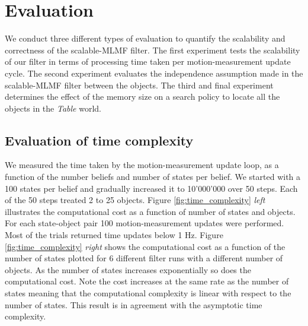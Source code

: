 


\section{Evaluation}\label{ch5:evaluation}

We conduct three different types of evaluation to quantify the scalability and correctness of the scalable-MLMF filter. The first experiment
tests the scalability of our filter in terms of processing time taken per motion-measurement update cycle. The second experiment evaluates the independence 
assumption made in the scalable-MLMF filter between the objects. The third and final experiment determines the effect of the 
memory size on a search policy to locate all the objects in the \textit{Table} world.

\subsection{Evaluation of time complexity}

We measured the time taken by the motion-measurement update loop, as a function of the number beliefs and number of states per belief. 
We started with a 100 states per belief and gradually increased it to 10'000'000 over 50 steps. Each of the 50 steps treated 2 to 25  objects. 
Figure \ref{fig:time_complexity} \textit{left} illustrates the computational
cost as a function of number of states and objects. For each state-object pair 100 motion-measurement updates were performed. Most of the trials returned time updates 
below 1 Hz. Figure \ref{fig:time_complexity} \textit{right} shows the computational cost as a function of the number of states plotted for 6 different filter runs with
a different number of objects. As the number of states increases exponentially so does the computational cost. Note the cost increases at the same
rate as the number of states meaning that the computational complexity is linear with respect to the number of states. This result is in agreement with 
the asymptotic time complexity.

